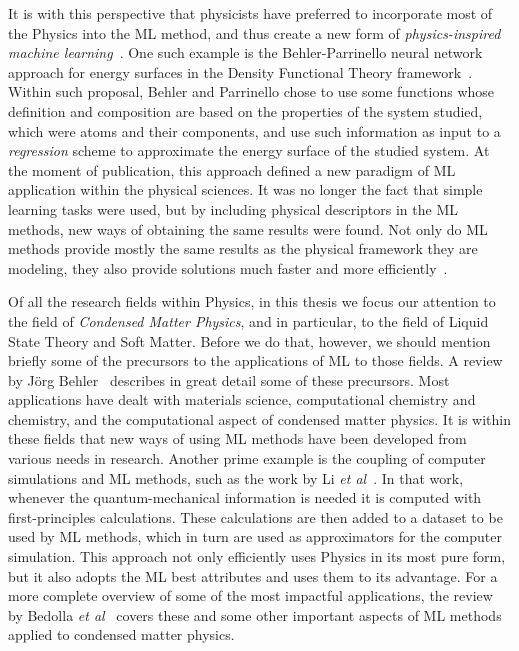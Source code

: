 It is with this perspective that physicists have preferred to incorporate most of the 
Physics into the ML method, and thus create a new form of
\emph{physics-inspired machine learning}~\cite{karniadakisPhysicsinformedMachineLearning2021a}.
One such example is the Behler-Parrinello neural network approach for energy surfaces
in the Density Functional Theory framework~\cite{behlerGeneralizedNeuralNetworkRepresentation2007a}.
Within such proposal, Behler and Parrinello chose to use some functions whose 
definition and composition are based on the properties of the system studied, which were 
atoms and their components,
and use such information as input to a \emph{regression} scheme to approximate the
energy surface of the studied system. At the moment of publication, this approach
defined a new paradigm of ML application within the physical sciences. It was no longer
the fact that simple learning tasks were used, but by including physical descriptors
in the ML methods, new ways of obtaining the same results were found.
Not only do ML methods provide mostly the same results as the physical framework they
are modeling, they also provide solutions much faster and more efficiently~\cite{zhuPhysicsconstrainedDeepLearning2019}.

Of all the research fields within Physics, in this thesis we focus
our attention to the field of \emph{Condensed Matter Physics}, and in particular, to the
field of Liquid State Theory and Soft Matter. Before we do that, however, we should
mention briefly some of the precursors to the applications of ML to those fields.
A review by J\"{o}rg Behler~\cite{behlerPerspectiveMachineLearning2016a}
describes in great detail some of these precursors. Most applications have dealt with
materials science, computational chemistry and chemistry, and the computational aspect
of condensed matter physics. It is within these fields that new ways of using ML methods
have been developed from various needs in research. Another prime example is the coupling
of computer simulations and ML methods, such as the work by Li \emph{et al}~\cite{liMolecularDynamicsOntheFly2015}.
In that work, whenever the quantum-mechanical information is needed it is computed with
first-principles calculations. These calculations are then added to a dataset to be used
by ML methods, which in turn are used as approximators for the computer simulation.
This approach not only efficiently uses Physics in its most pure form, but it also
adopts the ML best attributes and uses them to its advantage.
For a more complete overview of some of the most impactful applications, the
review by Bedolla \emph{et al}~\cite{bedollaMachineLearningCondensed2020}
covers these and some other important aspects of ML methods applied to
condensed matter physics.

